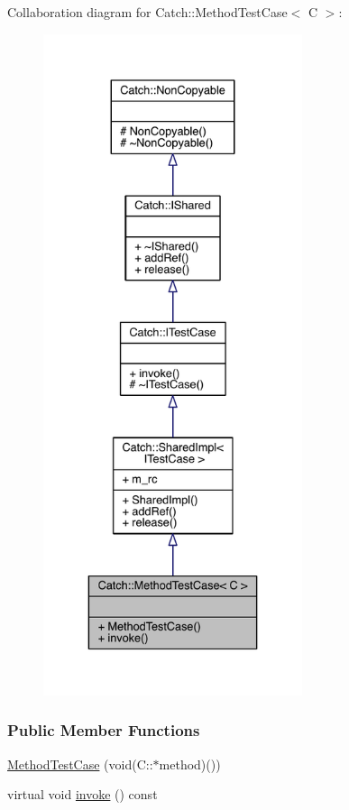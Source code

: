 Collaboration diagram for Catch\+:\+:Method\+Test\+Case$<$ C $>$\+:\nopagebreak
\begin{figure}[H]
\begin{center}
\leavevmode
\includegraphics[height=550pt]{a00233}
\end{center}
\end{figure}
\subsubsection*{Public Member Functions}
\begin{DoxyCompactItemize}
\item 
\hyperlink{a00051_a7b043b85dae371358255dd9dc6582e7b}{Method\+Test\+Case} (void(C\+::$\ast$method)())
\item 
virtual void \hyperlink{a00051_a39cc4b760dd71adc3f7550bc1e7eb697}{invoke} () const 
\end{DoxyCompactItemize}
